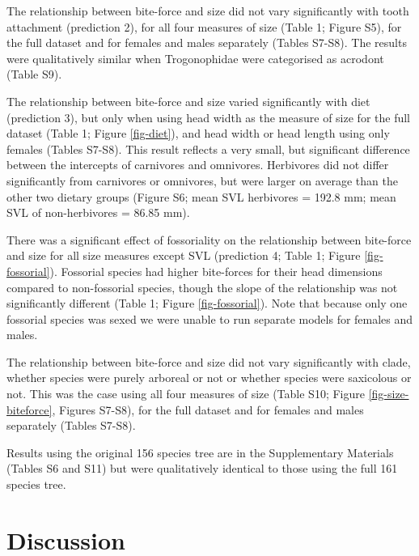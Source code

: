 \documentclass[a4paper, 12pt]{article}
\begin{document}
The relationship between bite-force and size did not vary significantly with tooth attachment (prediction 2), for all four measures of size (Table 1; Figure S5), for the full dataset and for females and males separately (Tables S7-S8). 
The results were qualitatively similar when Trogonophidae were categorised as acrodont (Table S9).


The relationship between bite-force and size varied significantly with diet (prediction 3), but only when using head width as the measure of size for the full dataset (Table 1; Figure \ref{fig-diet}), and head width or head length using only females (Tables S7-S8). 
This result reflects a very small, but significant difference between the intercepts of carnivores and omnivores. 
Herbivores did not differ significantly from carnivores or omnivores, but were larger on average than the other two dietary groups (Figure S6; mean SVL herbivores = 192.8 mm; mean SVL of non-herbivores = 86.85 mm).

There was a significant effect of fossoriality on the relationship between bite-force and size for all size measures except SVL (prediction 4; Table 1; Figure \ref{fig-fossorial}). 
Fossorial species had higher bite-forces for their head dimensions compared to non-fossorial species, though the slope of the relationship was not significantly different (Table 1; Figure \ref{fig-fossorial}). 
Note that because only one fossorial species was sexed we were unable to run separate models for females and males. 

The relationship between bite-force and size did not vary significantly with clade, whether species were purely arboreal or not or whether species were saxicolous or not. 
This was the case using all four measures of size (Table S10; Figure \ref{fig-size-biteforce}, Figures S7-S8), for the full dataset and for females and males separately (Tables S7-S8). 

Results using the original 156 species tree are in the Supplementary Materials (Tables S6 and S11) but were qualitatively identical to those using the full 161 species tree.


\section{Discussion}
\end{document}
